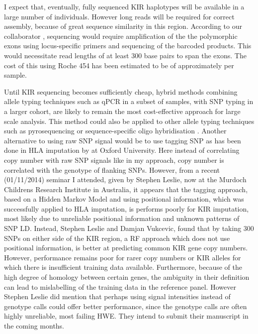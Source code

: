 I expect that, eventually, fully sequenced KIR haplotypes will be available in a large number of individuals.
However long reads will be required for correct assembly, because of great sequence similarity in this region.
According to our collaborator , sequencing would require amplification of the the polymorphic exons
using locus-specific primers and sequencing of the barcoded products.
This would necessitate read lengths of at least 300 base pairs to span the exons.
The cost of this using Roche 454 has been estimated to be of approximately  per sample.


Until KIR sequencing becomes sufficiently cheap, hybrid methods combining allele typing techniques such as qPCR
in a subset of samples, with SNP typing in a larger cohort, are likely to remain the most cost-effective approach for large scale analysis.  
This method could also be applied to other allele typing techniques such as pyrosequencing \citep{Norman:2009fi} or sequence-specific oligo hybridisation \citep{Martin:2007ik}.
Another alternative to using raw SNP signal would be to use tagging SNP as has been done in HLA imputation by \citet{Leslie:2008dq,Dilthey:2013dn} at Oxford University.
Here instead of correlating copy number with raw SNP signals like in my approach, copy number is correlated with the genotype of flanking SNPs.
However, from a recent (01/11/2014) seminar I attended, given by Stephen Leslie, now at the Murdoch Childrens Research Institute in Australia,
it appears that the tagging approach, based on a Hidden Markov Model and using positional information, which was successfully applied to HLA imputation,
is performs poorly for KIR imputation, most likely due to unreliable positional information and unknown patterns of SNP \gls{LD}.
Instead, Stephen Leslie and Damjan Vukcevic, found that by taking 300 SNPs on either side of the KIR region, a \acrfull{RF} approach which does
not use positional information, is better at predicting common KIR gene copy numbers.
However, performance remains poor for rarer copy numbers or KIR alleles for which there is 
insufficient training data available.
Furthermore, because of the high degree of homology between certain genes,
the ambiguity in their definition can lead to mislabelling of the training data in the reference panel.
However Stephen Leslie did mention that perhaps using signal intensities instead of genotype calls could offer better performance,
since the genotype calls are often highly unreliable, most failing \gls{HWE}.
They intend to submit their manuscript in the coming months.

